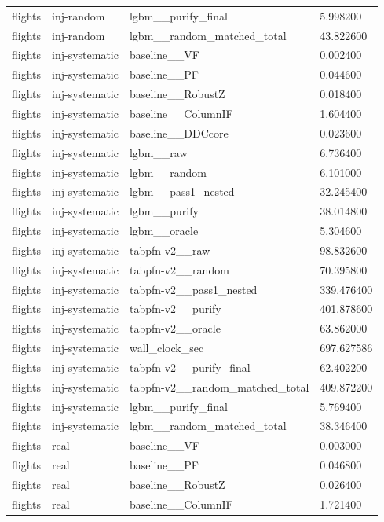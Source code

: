 \begin{tabular}{llll}
flights & inj-random & lgbm\_\_purify\_final & 5.998200 \\
flights & inj-random & lgbm\_\_random\_matched\_total & 43.822600 \\
flights & inj-systematic & baseline\_\_VF & 0.002400 \\
flights & inj-systematic & baseline\_\_PF & 0.044600 \\
flights & inj-systematic & baseline\_\_RobustZ & 0.018400 \\
flights & inj-systematic & baseline\_\_ColumnIF & 1.604400 \\
flights & inj-systematic & baseline\_\_DDCcore & 0.023600 \\
flights & inj-systematic & lgbm\_\_raw & 6.736400 \\
flights & inj-systematic & lgbm\_\_random & 6.101000 \\
flights & inj-systematic & lgbm\_\_pass1\_nested & 32.245400 \\
flights & inj-systematic & lgbm\_\_purify & 38.014800 \\
flights & inj-systematic & lgbm\_\_oracle & 5.304600 \\
flights & inj-systematic & tabpfn-v2\_\_raw & 98.832600 \\
flights & inj-systematic & tabpfn-v2\_\_random & 70.395800 \\
flights & inj-systematic & tabpfn-v2\_\_pass1\_nested & 339.476400 \\
flights & inj-systematic & tabpfn-v2\_\_purify & 401.878600 \\
flights & inj-systematic & tabpfn-v2\_\_oracle & 63.862000 \\
flights & inj-systematic & wall\_clock\_sec & 697.627586 \\
flights & inj-systematic & tabpfn-v2\_\_purify\_final & 62.402200 \\
flights & inj-systematic & tabpfn-v2\_\_random\_matched\_total & 409.872200 \\
flights & inj-systematic & lgbm\_\_purify\_final & 5.769400 \\
flights & inj-systematic & lgbm\_\_random\_matched\_total & 38.346400 \\
flights & real & baseline\_\_VF & 0.003000 \\
flights & real & baseline\_\_PF & 0.046800 \\
flights & real & baseline\_\_RobustZ & 0.026400 \\
flights & real & baseline\_\_ColumnIF & 1.721400 \\

\end{tabular}
